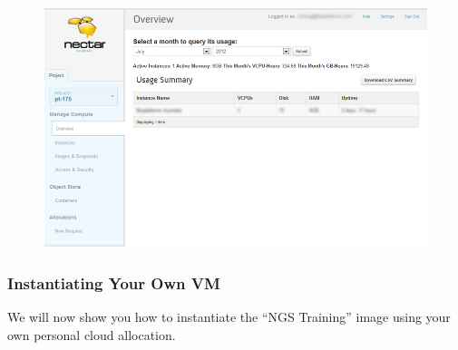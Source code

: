 \begin{enumerate}
  \begin{figure}[H]
    \centering
    \includegraphics[scale=0.5]{post-workshop/nectar/dashboard_overview.png}
    \caption{\label{fig:dashboard_overview}}
  \end{figure}
\end{enumerate}

\subsubsection{Instantiating Your Own VM}
We will now show you how to instantiate the ``NGS Training'' image using your
own personal cloud allocation.


